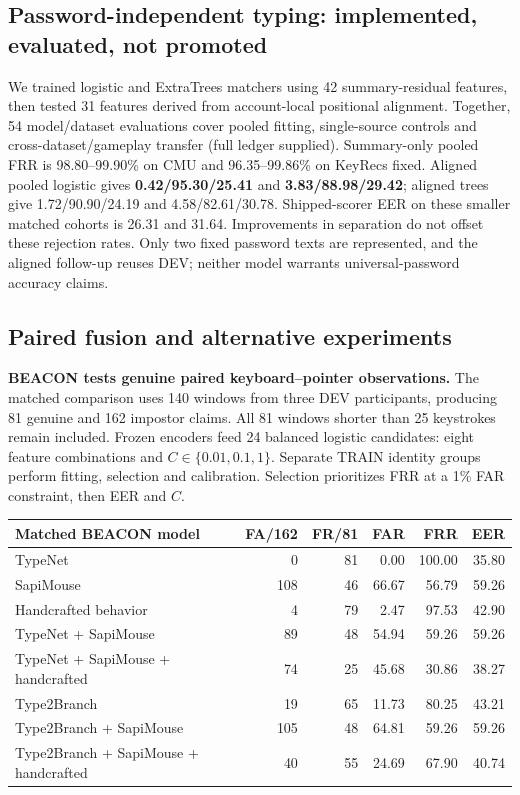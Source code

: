 \documentclass[10pt,a4paper]{article}
\begin{document}
\subsection{Password-independent typing: implemented, evaluated, not promoted}
We trained logistic and ExtraTrees matchers using 42 summary-residual features, then tested 31 features derived from account-local positional alignment. Together, 54 model/dataset evaluations cover pooled fitting, single-source controls and cross-dataset/gameplay transfer (full ledger supplied). Summary-only pooled FRR is 98.80--99.90\% on CMU and 96.35--99.86\% on KeyRecs fixed. Aligned pooled logistic gives \textbf{0.42/95.30/25.41} and \textbf{3.83/88.98/29.42}; aligned trees give 1.72/90.90/24.19 and 4.58/82.61/30.78. Shipped-scorer EER on these smaller matched cohorts is 26.31 and 31.64. Improvements in separation do not offset these rejection rates. Only two fixed password texts are represented, and the aligned follow-up reuses DEV; neither model warrants universal-password accuracy claims.

\newpage
\subsection{Paired fusion and alternative experiments}
\textbf{BEACON tests genuine paired keyboard--pointer observations.} The matched comparison uses 140 windows from three DEV participants, producing 81 genuine and 162 impostor claims. All 81 windows shorter than 25 keystrokes remain included. Frozen encoders feed 24 balanced logistic candidates: eight feature combinations and $C\in\{0.01,0.1,1\}$. Separate TRAIN identity groups perform fitting, selection and calibration. Selection prioritizes FRR at a 1\% FAR constraint, then EER and $C$.

\begin{center}\small
\begin{tabularx}{\linewidth}{@{}Xrrrrr@{}}
\toprule
\textbf{Matched BEACON model} & \textbf{FA/162} & \textbf{FR/81} & \textbf{FAR} & \textbf{FRR} & \textbf{EER}\\\midrule
TypeNet & 0 & 81 & 0.00 & 100.00 & 35.80\\
SapiMouse & 108 & 46 & 66.67 & 56.79 & 59.26\\
Handcrafted behavior & 4 & 79 & 2.47 & 97.53 & 42.90\\
TypeNet + SapiMouse & 89 & 48 & 54.94 & 59.26 & 59.26\\
TypeNet + SapiMouse + handcrafted & 74 & 25 & 45.68 & 30.86 & 38.27\\
Type2Branch & 19 & 65 & 11.73 & 80.25 & 43.21\\
Type2Branch + SapiMouse & 105 & 48 & 64.81 & 59.26 & 59.26\\
Type2Branch + SapiMouse + handcrafted & 40 & 55 & 24.69 & 67.90 & 40.74\\\bottomrule
\end{tabularx}
\end{center}
\end{document}
